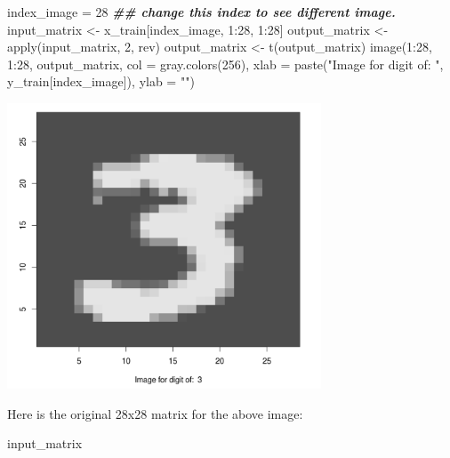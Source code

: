 \documentclass[
  12pt,
]{krantz}
\makeatletter
\newenvironment{Shaded}{\begin{snugshade}}{\end{snugshade}}
\newcommand{\AttributeTok}[1]{\textcolor[rgb]{0.61,0.61,0.61}{#1}}
\newcommand{\DecValTok}[1]{\textcolor[rgb]{0.06,0.06,0.06}{#1}}
\newcommand{\DocumentationTok}[1]{\textcolor[rgb]{0.37,0.37,0.37}{\textbf{\textit{#1}}}}
\newcommand{\FunctionTok}[1]{\textcolor[rgb]{0,0,0}{#1}}
\newcommand{\NormalTok}[1]{#1}
\newcommand{\OtherTok}[1]{\textcolor[rgb]{0.37,0.37,0.37}{#1}}
\newcommand{\SpecialCharTok}[1]{\textcolor[rgb]{0,0,0}{#1}}
\newcommand{\StringTok}[1]{\textcolor[rgb]{0.5,0.5,0.5}{#1}}
\newenvironment{kframe}{%
\medskip{}
\setlength{\fboxsep}{.8em}
 \def\at@end@of@kframe{}%
 \ifinner\ifhmode%
  \def\at@end@of@kframe{\end{minipage}}%
  \begin{minipage}{\columnwidth}%
 \fi\fi%
 \def\FrameCommand##1{\hskip\@totalleftmargin \hskip-\fboxsep
 \colorbox{shadecolor}{##1}\hskip-\fboxsep
     \hskip-\linewidth \hskip-\@totalleftmargin \hskip\columnwidth}%
 \MakeFramed {\advance\hsize-\width
   \@totalleftmargin\z@ \linewidth\hsize
   \@setminipage}}%
 {\par\unskip\endMakeFramed%
 \at@end@of@kframe}
\renewenvironment{Shaded}{\begin{kframe}}{\end{kframe}}
\makeatother
\begin{document}
\begin{Shaded}
\begin{Highlighting}[]
\NormalTok{index\_image }\OtherTok{=} \DecValTok{28}  \DocumentationTok{\#\# change this index to see different image.}
\NormalTok{input\_matrix }\OtherTok{\textless{}{-}}\NormalTok{ x\_train[index\_image, }\DecValTok{1}\SpecialCharTok{:}\DecValTok{28}\NormalTok{, }\DecValTok{1}\SpecialCharTok{:}\DecValTok{28}\NormalTok{]}
\NormalTok{output\_matrix }\OtherTok{\textless{}{-}} \FunctionTok{apply}\NormalTok{(input\_matrix, }\DecValTok{2}\NormalTok{, rev)}
\NormalTok{output\_matrix }\OtherTok{\textless{}{-}} \FunctionTok{t}\NormalTok{(output\_matrix)}
\FunctionTok{image}\NormalTok{(}\DecValTok{1}\SpecialCharTok{:}\DecValTok{28}\NormalTok{, }\DecValTok{1}\SpecialCharTok{:}\DecValTok{28}\NormalTok{, output\_matrix, }\AttributeTok{col =} \FunctionTok{gray.colors}\NormalTok{(}\DecValTok{256}\NormalTok{), }
    \AttributeTok{xlab =} \FunctionTok{paste}\NormalTok{(}\StringTok{"Image for digit of: "}\NormalTok{, y\_train[index\_image]), }
    \AttributeTok{ylab =} \StringTok{""}\NormalTok{)}
\end{Highlighting}
\end{Shaded}

\includegraphics[width=0.7\textwidth,height=\textheight]{images/mnist_image3.png}

Here is the original 28x28 matrix for the above image:

\begin{Shaded}
\begin{Highlighting}[]
\NormalTok{input\_matrix}
\end{Highlighting}
\end{Shaded}
\end{document}
